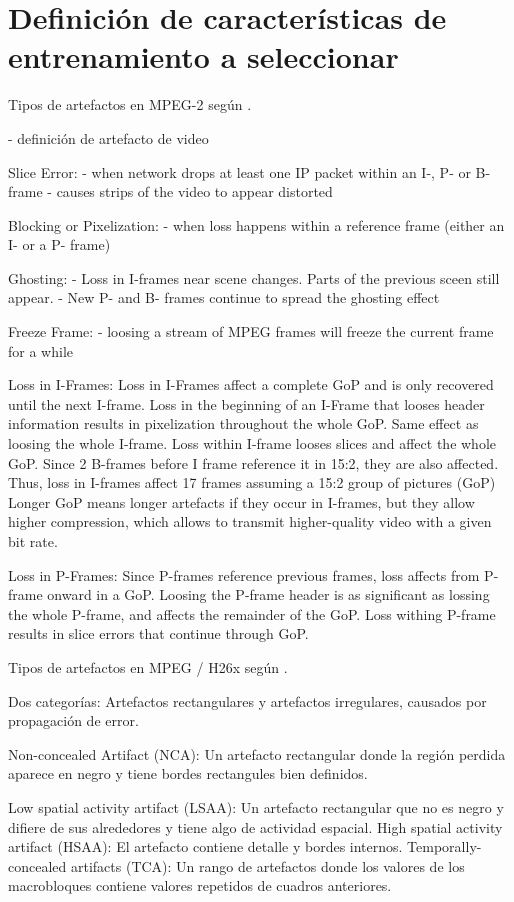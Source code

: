 \section{Definición de características de entrenamiento a seleccionar}

Tipos de artefactos en MPEG-2 según \cite{Greengrass2009}.

- definición de artefacto de video

Slice Error:
- when network drops at least one IP packet within an I-, P- or B- frame
- causes strips of the video to appear distorted

Blocking or Pixelization:
- when loss happens within a reference frame (either an I- or a P- frame)

Ghosting:
- Loss in I-frames near scene changes. Parts of the previous sceen still appear.
- New P- and B- frames continue to spread the ghosting effect

Freeze Frame:
- loosing a stream of MPEG frames will freeze the current frame for a while

Loss in I-Frames:
Loss in I-Frames affect a complete GoP and is only recovered until the next I-frame.
Loss in the beginning of an I-Frame that looses header information results in pixelization throughout the whole GoP. Same effect as loosing the whole I-frame.
Loss within I-frame looses slices and affect the whole GoP.
Since 2 B-frames before I frame reference it in 15:2, they are also affected.
Thus, loss in I-frames affect 17 frames assuming a 15:2 group of pictures (GoP)
Longer GoP means longer artefacts if they occur in I-frames, but they allow
higher compression, which allows to transmit higher-quality video with a given
bit rate.

Loss in P-Frames:
Since P-frames reference previous frames, loss affects from P-frame onward in a GoP.
Loosing the P-frame header is as significant as lossing the whole P-frame, and affects the remainder of the GoP.
Loss withing P-frame results in slice errors that continue through GoP.

Tipos de artefactos en MPEG / H26x según \cite{Glavota2016}.

Dos categorías: Artefactos rectangulares y artefactos irregulares, causados por propagación de error.

Non-concealed Artifact (NCA): Un artefacto rectangular donde la región perdida aparece en negro y tiene bordes rectangules bien definidos.

Low spatial activity artifact (LSAA): Un artefacto rectangular que no es negro y difiere de sus alrededores y tiene algo de actividad espacial.
High spatial activity artifact (HSAA): El artefacto contiene detalle y bordes internos.
Temporally-concealed artifacts (TCA): Un rango de artefactos donde los valores de los macrobloques contiene valores repetidos de cuadros anteriores.

